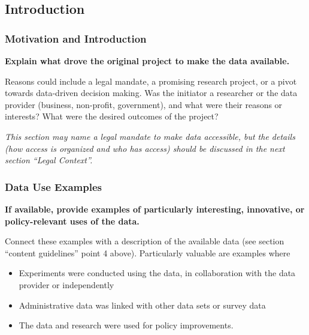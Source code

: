 \documentclass[
]{book}
\providecommand{\tightlist}{%
  \setlength{\itemsep}{0pt}\setlength{\parskip}{0pt}}
\begin{document}
\hypertarget{introduction-10}{%
\subsection*{Introduction}\label{introduction-10}}

\hypertarget{motivation-and-introduction}{%
\subsubsection*{Motivation and Introduction}\label{motivation-and-introduction}}

\textbf{Explain what drove the original project to make the data available.}

Reasons could include a legal mandate, a promising research project, or a pivot towards data-driven decision making. Was the initiator a researcher or the data provider (business, non-profit, government), and what were their reasons or interests? What were the desired outcomes of the project?

\emph{This section may name a legal mandate to make data accessible, but the details (how access is organized and who has access) should be discussed in the next section ``Legal Context''.}

\hypertarget{data-use-examples-9}{%
\subsubsection*{Data Use Examples}\label{data-use-examples-9}}

\textbf{If available, provide examples of particularly interesting, innovative, or policy-relevant uses of the data.}

Connect these examples with a description of the available data (see section ``content guidelines'' point 4 above). Particularly valuable are examples where

\begin{itemize}
\tightlist
\item
  Experiments were conducted using the data, in collaboration with the data provider or independently
\item
  Administrative data was linked with other data sets or survey data
\item
  The data and research were used for policy improvements.
\end{itemize}
\end{document}
